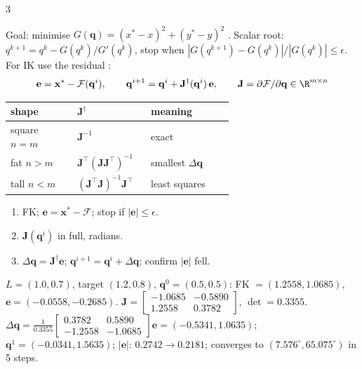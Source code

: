 \begin{multicols}{3}
\begin{fbx}
Goal: minimise $G(\mathbf q)=(x^*-x)^2+(y^*-y)^2$ . Scalar root: $q^{k+1}=q^k-G(q^k)/G'(q^k)$, stop when $|G(q^{k+1})-G(q^k)|/|G(q^k)|\le\epsilon$. For IK use the residual :
\[\mathbf e=\mathbf x^*-\mathcal F(\mathbf q^i),\qquad \mathbf q^{i+1}=\mathbf q^i+\mathbf J^\dagger(\mathbf q^i)\,\mathbf e,\qquad \mathbf J=\partial\mathcal F/\partial\mathbf q\in\R^{m\times n}\]
\end{fbx}
\begin{fbx}
\begin{tabularx}{\linewidth}{@{}>{\raggedright\arraybackslash}p{0.3\linewidth}>{\raggedright\arraybackslash}p{0.33\linewidth}X@{}}
\toprule shape & $\mathbf J^\dagger$ & meaning\\\midrule
square $n=m$ & $\mathbf J^{-1}$ & exact\\
fat $n>m$ & $\mathbf J^\top(\mathbf J\mathbf J^\top)^{-1}$ & smallest $\Delta\mathbf q$\\
tall $n<m$ & $(\mathbf J^\top\mathbf J)^{-1}\mathbf J^\top$ & least squares\\
\bottomrule
\end{tabularx}
\end{fbx}
\begin{recipe}
\begin{enumerate}
\item FK; $\mathbf e=\mathbf x^*-\mathcal F$; stop if $|\mathbf e|\le\epsilon$.
\item $\mathbf J(\mathbf q^i)$ in full, radians.
\item $\Delta\mathbf q=\mathbf J^\dagger\mathbf e$; $\mathbf q^{i+1}=\mathbf q^i+\Delta\mathbf q$; confirm $|\mathbf e|$ fell.
\end{enumerate}
\end{recipe}
\begin{worked}
$L=(1.0,0.7)$, target $(1.2,0.8)$, $\mathbf q^0=(0.5,0.5)$: FK $=(1.2558,1.0685)$, $\mathbf e=(-0.0558,-0.2685)$. $\mathbf J=\begin{bmatrix}-1.0685&-0.5890\\1.2558&0.3782\end{bmatrix}$, $\det=0.3355$. $\Delta\mathbf q=\frac1{0.3355}\begin{bmatrix}0.3782&0.5890\\-1.2558&-1.0685\end{bmatrix}\mathbf e=(-0.5341,1.0635)$; $\mathbf q^1=(-0.0341,1.5635)$; $|\mathbf e|$: $0.2742\to0.2181$; converges to $(7.576^\circ,65.075^\circ)$ in 5 steps. \chk\\

\end{worked}
\end{multicols}
